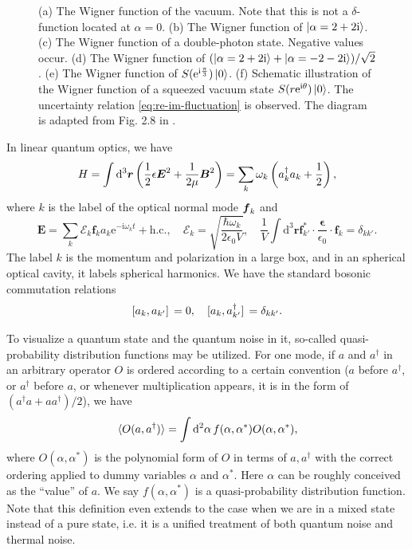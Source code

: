 \documentclass[hyperref, a4paper]{article}
\newcommand*{\ii}{\mathrm{i}}
\newcommand*{\ee}{\mathrm{e}}
\begin{document}
\begin{figure}
{    (a) The Wigner function of the vacuum. Note that this is not a $\delta$-function located at $\alpha = 0$.
    (b) The Wigner function of $\ket{\alpha = 2 + 2\ii}$.
    (c) The Wigner function of a double-photon state. Negative values occur.
    (d) The Wigner function of $(\ket{\alpha = 2 + 2 \ii} + \ket{\alpha = - 2 - 2 \ii}) / \sqrt{2}$.
    (e) The Wigner function of $S(\ee^{\ii \frac{\pi}{3}}) \ket{0}$.
    (f) Schematic illustration of the Wigner function of a squeezed vacuum state
    $S(r\ee^{\ii \theta}) \ket{0}$.
    The uncertainty relation \eqref{eq:re-im-fluctuation} is observed.
    The diagram is adapted from Fig. 2.8 in \cite{scully1999quantum}.
    }
    \label{fig:wigner-example}
\end{figure}

In linear quantum optics, we have \cite{steck2007quantum} 
\begin{equation}
    H = \int \dd[3]{\vb*{r}} \left( \frac{1}{2} \epsilon \vb*{E}^2 + \frac{1}{2 \mu} \vb*{B}^2 \right)
    = \sum_{k} \omega_k \left( a^\dagger_k a_k + \frac{1}{2} \right),
\end{equation}
where $k$ is the label of the optical normal mode $\vb*{f}_k$ and 
\begin{equation}
    \boldsymbol{E}=\sum_k \mathcal{E}_k \boldsymbol{f}_k a_k \mathrm{e}^{-\mathrm{i} \omega_k t}+\text {h.c.} , \quad 
    \mathcal{E}_k = \sqrt{\frac{\hbar \omega_k}{2 \epsilon_0 V}} , \quad \frac{1}{V} \int \mathrm{d}^3 \boldsymbol{r} \boldsymbol{f}_{k'}^* \cdot \frac{\boldsymbol{\epsilon}}{\epsilon_0} \cdot \boldsymbol{f}_k =\delta_{k k'} .
\end{equation}
The label $k$ is the momentum and polarization in a large box, 
and in an spherical optical cavity, it labels spherical harmonics.
We have the standard bosonic commutation relations 
\begin{equation}
    \comm*{a_k}{a_{k'}} = 0, \quad \comm*{a_k}{a^\dagger_{k'}} = \delta_{k k'}.
\end{equation}

To visualize a quantum state and the quantum noise in it,
so-called quasi-probability distribution functions may be utilized.
For one mode, if $a$ and $a^\dagger$ in an arbitrary operator $O$ is ordered according to a certain convention
($a$ before $a^\dagger$, or $a^\dagger$ before $a$, 
or whenever multiplication appears, it is in the form of $(a^\dagger a + a a^\dagger) / 2$), 
we have 
\begin{equation}
    \expval*{O(a, a^\dagger)} = \int \dd[2]{\alpha} f(\alpha, \alpha^*) O(\alpha, \alpha^*),
\end{equation}
where $O(\alpha, \alpha^*)$ is the 
polynomial form of $O$ in terms of $a, a^\dagger$ with the correct ordering
applied to dummy variables $\alpha$ and $\alpha^*$.
Here $\alpha$ can be roughly conceived as the ``value'' of $a$.
We say $f(\alpha, \alpha^*)$ is a quasi-probability distribution function.
Note that this definition even extends to the case 
when we are in a mixed state instead of a pure state, 
i.e. it is a unified treatment of both quantum noise and thermal noise.
\end{document}
